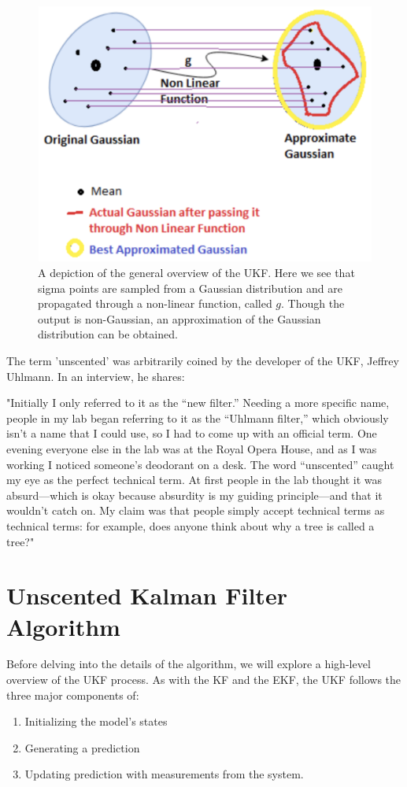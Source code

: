 \begin{figure}[h]
    \centering
    \includegraphics[scale = 0.7]{UKF.png}
    \caption{A depiction of the general overview of the UKF. Here we see that sigma points are sampled from a Gaussian distribution and are propagated through a non-linear function, called $g$. Though the output is non-Gaussian, an approximation of the Gaussian distribution can be obtained.}
\end{figure}

\newpage

The term 'unscented' was arbitrarily coined by the developer of the UKF, Jeffrey Uhlmann. In an interview, he shares:
\begin{displayquote}
"Initially I only referred to it as the “new filter.” Needing a more specific name, people in my lab began referring to it as the “Uhlmann filter,” which obviously isn’t a name that I could use, so I had to come up with an official term. One evening everyone else in the lab was at the Royal Opera House, and as I was working I noticed someone’s deodorant on a desk. The word “unscented” caught my eye as the perfect technical term. At first people in the lab thought it was absurd—which is okay because absurdity is my guiding principle—and that it wouldn’t catch on. My claim was that people simply accept technical terms as technical terms: for example, does anyone think about why a tree is called a tree?"
\end{displayquote}


\section{Unscented Kalman Filter Algorithm}
Before delving into the details of the algorithm, we will explore a high-level overview of the UKF process. As with the KF and the EKF, the UKF follows the three major components of:
\begin{enumerate}
  \item Initializing the model's states
  \item Generating a prediction
  \item Updating prediction with measurements from the system.
\end{enumerate}

